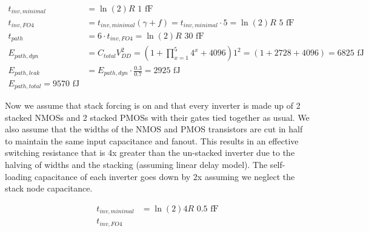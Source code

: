 \documentclass[11pt]{article}
\begin{document}
\begin{align}
	t_{inv,minimal} &= \ln(2) R \text{ 1 fF} \nonumber \\
	t_{inv,FO4} &= t_{inv,minimal} (\gamma + f) = t_{inv,minimal} \cdot 5 = \ln(2) R \text{ 5 fF} \nonumber \\
	t_{path} &= 6 \cdot t_{inv,FO4} = \ln(2) R \text{ 30 fF} \nonumber \\
	E_{path,dyn} &= C_{total} V_{DD}^2 = (1 + \prod_{x=1}^{5}4^x + 4096) 1^2 = (1 + 2728 + 4096) = 6825 \text{ fJ} \nonumber \\
	E_{path,leak} &= E_{path,dyn} \cdot \frac{0.3}{0.7} = 2925 \text{ fJ}\nonumber \\
	E_{path,total} = 9570 \text{ fJ} \nonumber
\end{align}

Now we assume that stack forcing is on and that every inverter is made up of 2 stacked NMOSs and 2 stacked PMOSs with their gates tied together as usual. We also assume that the widths of the NMOS and PMOS transistors are cut in half to maintain the same input capacitance and fanout. This results in an effective switching resistance that is 4x greater than the un-stacked inverter due to the halving of widths and the stacking (assuming linear delay model). The self-loading capacitance of each inverter goes down by 2x assuming we neglect the stack node capacitance.

\begin{align}
	t_{inv,minimal} &= \ln(2) 4 R \text{ 0.5 fF} \nonumber \\
	t_{inv,FO4} 
\end{align}
\newpage
\appendix
\end{document}
